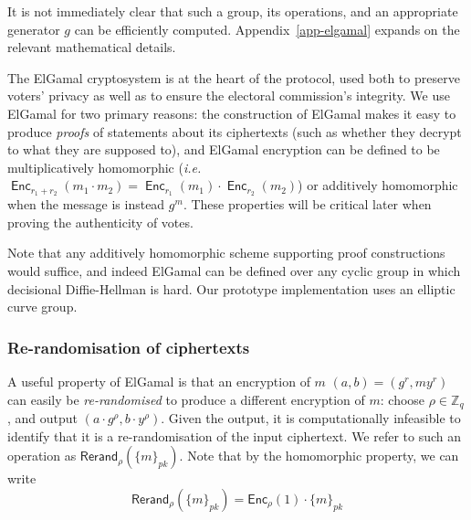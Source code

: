 \documentclass[12pt,a4paper]{article}
\DeclareMathOperator{\Enc}{\mathsf{Enc}}
\theoremstyle{definition}
\newcommand{\ie}{\textit{i.e. }}
\begin{document}
It is not immediately clear that such a group, its operations, and an appropriate generator $g$ can be efficiently computed. Appendix~\ref{app-elgamal} expands on the relevant mathematical details.

The ElGamal cryptosystem is at the heart of the protocol, used both to preserve voters' privacy as well as to ensure the electoral commission's integrity. We use ElGamal for two primary reasons: the construction of ElGamal makes it easy to produce \textit{proofs} of statements about its ciphertexts (such as whether they decrypt to what they are supposed to), and ElGamal encryption can be defined to be multiplicatively homomorphic (\ie $\Enc_{r_1+r_2}(m_1\cdot m_2)=\Enc_{r_1}(m_1)\cdot\Enc_{r_2}(m_2)$) or additively homomorphic when the message is instead $g^m$. These properties will be critical later when proving the authenticity of votes.

Note that any additively homomorphic scheme supporting proof constructions would suffice, and indeed ElGamal can be defined over any cyclic group in which decisional Diffie-Hellman is hard. Our prototype implementation uses an elliptic curve group.

\subsubsection{Re-randomisation of ciphertexts}
A useful property of ElGamal is that an encryption of $m$ $(a, b)=(g^r, my^r)$ can easily be \textit{re-randomised} to produce a different encryption of $m$: choose $\rho\in\mathbb{Z}_q$, and output $(a\cdot g^\rho, b\cdot y^\rho)$. Given the output, it is computationally infeasible to identify that it is a re-randomisation of the input ciphertext. We refer to such an operation as $\mathsf{Rerand}_\rho(\{m\}_{pk})$. Note that by the homomorphic property, we can write
$$\mathsf{Rerand}_\rho(\{m\}_{pk})=\mathsf{Enc}_{\rho}(1)\cdot\{m\}_{pk}$$
\end{document}
